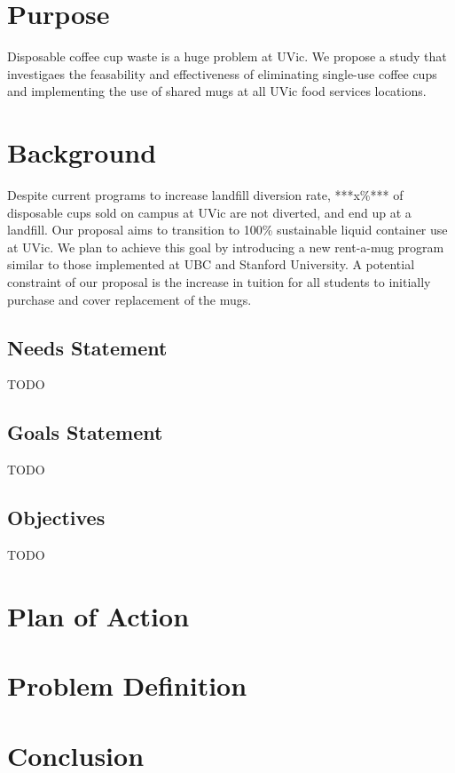 \documentclass[letterpaper,11pt]{texMemo} %
\begin{document}
\maketitle %


\section*{Purpose}
Disposable coffee cup waste is a huge problem at UVic. We propose a study
that investigaes the feasability and effectiveness of eliminating single-use
coffee cups and implementing the use of shared mugs at all UVic food services
locations.
\section*{Background}
Despite current programs to increase landfill diversion rate, ***x\%*** of
disposable cups sold on campus at UVic are not diverted, and end up at a landfill.
Our proposal aims to transition to 100\% sustainable liquid container use at UVic.
We plan to achieve this goal by introducing a new rent-a-mug program similar to
those implemented at UBC and Stanford University. A potential constraint of
our proposal is the increase in tuition for all students to initially purchase
and cover replacement of the mugs.
\subsection*{Needs Statement}
TODO
\subsection*{Goals Statement}
TODO
\subsection*{Objectives}
TODO

\section*{Plan of Action}
\section*{Problem Definition}


\section*{Conclusion}

\end{document}
